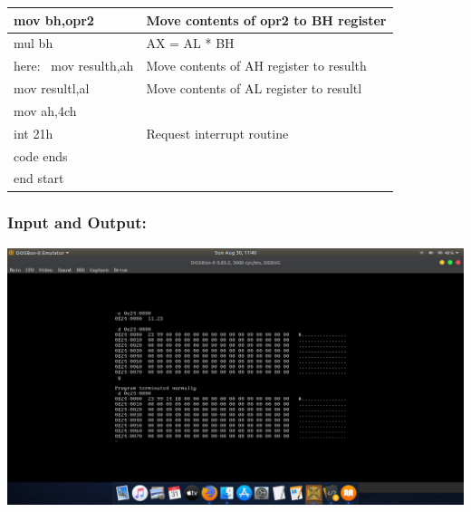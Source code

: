 \documentclass[12pt,a4paper]{article}
\begin{document}
\begin{flushleft}
\begin{table}[htb]
{\begin{tabular}{|l|l|}
\hline
mov bh,opr2                                                      & Move contents of opr2 to BH register          \\ 
\hline
mul bh                                                           & AX = AL * BH                                  \\ 
\hline
here:~ mov resulth,ah                                            & Move contents of AH register to resulth       \\ 
\hline
mov resultl,al                                                   & Move contents of AL register to resultl       \\ 
\hline
mov ah,4ch                                                       &                                               \\ 
\hline
int 21h                                                          & Request interrupt routine                     \\ 
\hline
code ends                                                        &                                               \\ 
\hline
end start                                                        &                                               \\
\hline
\end{tabular}
}
\end{table}

\subsubsection*{\textbf{Input and Output:}}
\includegraphics[trim = 100mm 60mm 100mm 80mm, clip, width = \textwidth]{Multiplication.png}

\newpage

\end{flushleft}
\end{document}
